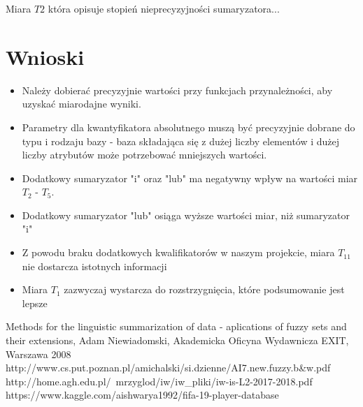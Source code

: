 \documentclass{classrep}
\begin{document}
Miara $T2$ która opisuje stopień nieprecyzyjności sumaryzatora...

\section{Wnioski}
\begin{itemize}
	\item Należy dobierać precyzyjnie wartości przy funkcjach przynależności, aby uzyskać miarodajne wyniki.
	\item Parametry dla kwantyfikatora absolutnego muszą być precyzyjnie dobrane do typu i rodzaju bazy - baza składająca się z dużej liczby elementów i dużej liczby atrybutów może potrzebować mniejszych wartości. 
	\item Dodatkowy sumaryzator "i" oraz "lub" ma negatywny wpływ na wartości miar $T_2$ - $T_5$.
	\item Dodatkowy sumaryzator "lub" osiąga wyższe wartości miar, niż sumaryzator "i"
	\item Z powodu braku dodatkowych kwalifikatorów w naszym projekcie, miara $T_11$ nie dostarcza istotnych informacji
	\item Miara $T_1$ zazwyczaj wystarcza do rozstrzygnięcia, które podsumowanie jest lepsze
\end{itemize}

	

\begin{thebibliography}{}
Methods for the linguistic summarization of data - aplications of fuzzy sets and their extensions, Adam Niewiadomski, Akademicka Oficyna Wydawnicza EXIT, Warszawa 2008
http://www.cs.put.poznan.pl/amichalski/si.dzienne/AI7.new.fuzzy.b\&w.pdf
http://home.agh.edu.pl/~mrzyglod/iw/iw\_pliki/iw-is-L2-2017-2018.pdf
https://www.kaggle.com/aishwarya1992/fifa-19-player-database
\end{thebibliography}
\end{document}

